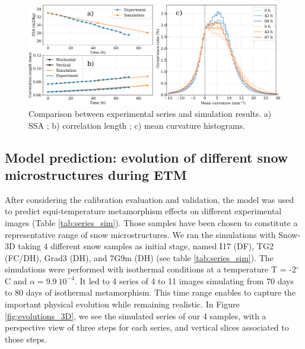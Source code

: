 \documentclass[draft,ms]{agujournal2019}
\begin{document}

\begin{figure}
    \centering
    \includegraphics[width=\linewidth]{Figures/eboni_courbes_lc_ssa_histo.pdf}
    \caption{Comparison between \protect{} experimental series and simulation results. a) SSA ; b) correlation length ; c) mean curvature histograms.}
    \label{fig:eboni}
\end{figure}


\subsection{Model prediction: evolution of different snow microstructures during ETM}

After considering the calibration evaluation and validation, the model was used to predict equi-temperature metamorphism effects on different experimental images (Table \ref{tab:series_sim}). Those samples have been chosen to constitute a representative range of snow microstructures. We ran the simulations with Snow-3D taking 4 different snow samples as initial stage, named I17 (DF), TG2 (FC/DH), Grad3 (DH), and 7G9m (DH) (see table \ref{tab:series_sim}). The simulations were performed with isothermal conditions at a temperature T = -2$^\circ$C and $\alpha = 9.9\ 10^{-4}$. It led to 4 series of 4 to 11 images simulating from 70 days to 80 days of isothermal metamorphism. This time range enables to capture the important physical evolution while remaining realistic. In Figure \ref{fig:evolutions_3D}, we see the simulated series of our 4 samples, with a perspective view of three steps for each series, and vertical slices associated to those steps.\\
\end{document}

